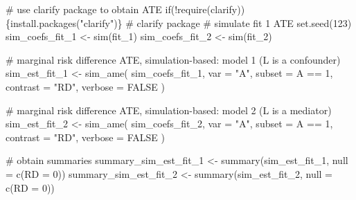 \documentclass[
  singlecolumn]{article}
\newenvironment{Shaded}{}{}
\newcommand{\AttributeTok}[1]{\textcolor[rgb]{0.84,0.23,0.29}{#1}}
\newcommand{\CommentTok}[1]{\textcolor[rgb]{0.42,0.45,0.49}{#1}}
\newcommand{\ConstantTok}[1]{\textcolor[rgb]{0.00,0.36,0.77}{#1}}
\newcommand{\ControlFlowTok}[1]{\textcolor[rgb]{0.84,0.23,0.29}{#1}}
\newcommand{\DecValTok}[1]{\textcolor[rgb]{0.00,0.36,0.77}{#1}}
\newcommand{\FunctionTok}[1]{\textcolor[rgb]{0.44,0.26,0.76}{#1}}
\newcommand{\NormalTok}[1]{\textcolor[rgb]{0.14,0.16,0.18}{#1}}
\newcommand{\OtherTok}[1]{\textcolor[rgb]{0.44,0.26,0.76}{#1}}
\newcommand{\SpecialCharTok}[1]{\textcolor[rgb]{0.00,0.36,0.77}{#1}}
\newcommand{\StringTok}[1]{\textcolor[rgb]{0.01,0.18,0.38}{#1}}
\begin{document}
\begin{Shaded}
\begin{Highlighting}[]
\CommentTok{\# use \textasciigrave{}clarify\textasciigrave{} package to obtain ATE}
\ControlFlowTok{if}\NormalTok{(}\SpecialCharTok{!}\FunctionTok{require}\NormalTok{(clarify))\{}\FunctionTok{install.packages}\NormalTok{(}\StringTok{"clarify"}\NormalTok{)\} }\CommentTok{\# clarify package}
\CommentTok{\# simulate fit 1 ATE}
\FunctionTok{set.seed}\NormalTok{(}\DecValTok{123}\NormalTok{)}
\NormalTok{sim\_coefs\_fit\_1 }\OtherTok{\textless{}{-}} \FunctionTok{sim}\NormalTok{(fit\_1)}
\NormalTok{sim\_coefs\_fit\_2 }\OtherTok{\textless{}{-}} \FunctionTok{sim}\NormalTok{(fit\_2)}

\CommentTok{\# marginal risk difference ATE, simulation{-}based: model 1 (L is a confounder)}
\NormalTok{sim\_est\_fit\_1 }\OtherTok{\textless{}{-}}
  \FunctionTok{sim\_ame}\NormalTok{(}
\NormalTok{    sim\_coefs\_fit\_1,}
    \AttributeTok{var =} \StringTok{"A"}\NormalTok{,}
    \AttributeTok{subset =}\NormalTok{ A }\SpecialCharTok{==} \DecValTok{1}\NormalTok{,}
    \AttributeTok{contrast =} \StringTok{"RD"}\NormalTok{,}
    \AttributeTok{verbose =} \ConstantTok{FALSE}
\NormalTok{  )}

\CommentTok{\# marginal risk difference ATE, simulation{-}based: model 2 (L is a mediator)}
\NormalTok{sim\_est\_fit\_2 }\OtherTok{\textless{}{-}}
  \FunctionTok{sim\_ame}\NormalTok{(}
\NormalTok{    sim\_coefs\_fit\_2,}
    \AttributeTok{var =} \StringTok{"A"}\NormalTok{,}
    \AttributeTok{subset =}\NormalTok{ A }\SpecialCharTok{==} \DecValTok{1}\NormalTok{,}
    \AttributeTok{contrast =} \StringTok{"RD"}\NormalTok{,}
    \AttributeTok{verbose =} \ConstantTok{FALSE}
\NormalTok{  )}

\CommentTok{\# obtain summaries}
\NormalTok{summary\_sim\_est\_fit\_1 }\OtherTok{\textless{}{-}} \FunctionTok{summary}\NormalTok{(sim\_est\_fit\_1, }\AttributeTok{null =} \FunctionTok{c}\NormalTok{(}\StringTok{\textasciigrave{}}\AttributeTok{RD}\StringTok{\textasciigrave{}} \OtherTok{=} \DecValTok{0}\NormalTok{))}
\NormalTok{summary\_sim\_est\_fit\_2 }\OtherTok{\textless{}{-}} \FunctionTok{summary}\NormalTok{(sim\_est\_fit\_2, }\AttributeTok{null =} \FunctionTok{c}\NormalTok{(}\StringTok{\textasciigrave{}}\AttributeTok{RD}\StringTok{\textasciigrave{}} \OtherTok{=} \DecValTok{0}\NormalTok{))}


\end{Highlighting}
\end{Shaded}
\end{document}
